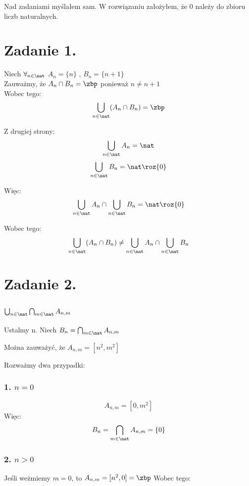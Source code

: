 \documentclass{article}
\begin{document}
 
 
 
 
 
 
 
 
 
 
\maketitle
Nad zadaniami myślałem sam. W rozwiązaniu założyłem, że 0 należy do zbioru liczb naturalnych.
\section*{Zadanie 1.}
Niech $\forall_{ n \in \nat }$ $A_n = \{n\}$ , $B_n = \{n+1\}$
\\ Zauważmy, że $A_n \cap B_n = \zbp$  ponieważ $n\neq n+1$
\\Wobec tego: 
\[\bigcup_{n \in \nat} ( A_n \cap B_n ) = \zbp \]

Z drugiej strony: 
\[ \bigcup_{n \in \nat } A_n = \nat  \]
\[ \bigcup_{n \in \nat } B_n = \nat \roz \{0\}  \]

Więc:
\[ \bigcup_{n \in \nat } A_n \cap \bigcup_{n \in \nat } B_n = \nat \roz \{0\}  \]

Wobec tego: 
\[ \bigcup_{n \in \nat} ( A_n \cap B_n ) \neq \bigcup_{n \in \nat } A_n \cap \bigcup_{n \in \nat } B_n   \]

\section*{Zadanie 2.}


\subsection*{$\bigcup_{n \in \nat} \bigcap_{m \in \nat} A_{n,m}$}  

Ustalmy n. Niech $B_n = \bigcap_{m \in \nat} A_{n,m}$

Można zauważyć, że $A_{n,m} = [n^2,m^2]$

Rozważmy dwa przypadki:
\subsubsection*{1. $n=0$}
\[A_{n,m} = [0,m^2]\]
Więc: \[B_n = \bigcap_{m \in \nat} A_{n,m} = \{0\}\]

\subsubsection*{2. $n>0$}
Jeśli weżmiemy $m = 0$, to $A_{n,m}= [n^2,0] = \zbp$
Wobec tego:
\end{document}
